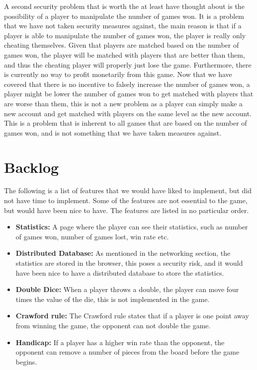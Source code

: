 \documentclass[ twoside,openright,titlepage,numbers=noenddot,headinclude,%
                footinclude=true,cleardoublepage=empty,abstractoff, %
                BCOR=5mm,paper=a4,fontsize=11pt,%
                ngerman,american,%
                ]{scrreprt}
\begin{document}
A second security problem that is worth the at least have thought about is the possibility of a player to manipulate the number of games won. It is a problem that we have not taken security measures against, the main reason is that if a player is able to manipulate the number of games won, the player is really only cheating themselves. Given that players are matched based on the number of games won, the player will be matched with players that are better than them, and thus the cheating player will properly just lose the game. Furthermore, there is currently no way to profit monetarily from this game. Now that we have covered that there is no incentive to falsely increase the number of games won, a player might be lower the number of games won to get matched with players that are worse than them, this is not a new problem as a player can simply make a new account and get matched with players on the same level as the new account. This is a problem that is inherent to all games that are based on the number of games won, and is not something that we have taken measures against.


\section{Backlog}
The following is a list of features that we would have liked to implement, but did not have time to implement. Some of the features are not essential to the game, but would have been nice to have. The features are listed in no particular order.
\begin{itemize}
  \item \textbf{Statistics:} A page where the player can see their statistics, such as number of games won, number of games lost, win rate etc.
  \item \textbf{Distributed Database:} As mentioned in the networking section, the statistics are stored in the browser, this poses a security risk, and it would have been nice to have a distributed database to store the statistics.
  \item \textbf{Double Dice:} When a player throws a double, the player can move four times the value of the die, this is not implemented in the game.
  \item \textbf{Crawford rule:} The Crawford rule states that if a player is one point away from winning the game, the opponent can not double the game. 
  \item \textbf{Handicap:} If a player has a higher win rate than the opponent, the opponent can remove a number of pieces from the board before the game begins.
\end{itemize}
\end{document}
